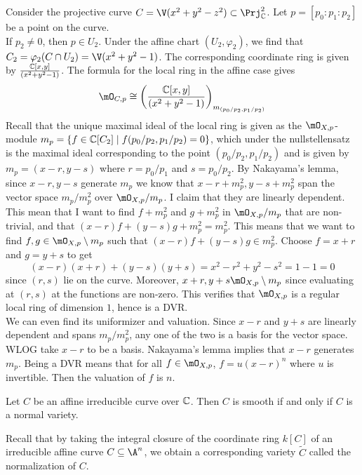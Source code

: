\documentclass[a4paper]{article}
\begin{document}
\begin{eg}{}{} Consider the projective curve $C=\V(x^2+y^2-z^2)\subset\Prj_\C^2$. Let $p=[p_0:p_1:p_2]$ be a point on the curve. \\

If $p_2\neq 0$, then $p\in U_2$. Under the affine chart $(U_2,\varphi_2)$, we find that $C_2=\varphi_2(C\cap U_2)=\V(x^2+y^2-1)$. The corresponding coordinate ring is given by $\frac{\mathbb{C}[x,y]}{(x^2+y^2-1)}$. The formula for the local ring in the affine case gives $$\mO_{C,p}\cong\left(\frac{\C[x,y]}{(x^2+y^2-1)}\right)_{m_{(p_0/p_2,p_1/p_2)}}$$ Recall that the unique maximal ideal of the local ring is given as the $\mO_{X,p}$-module $m_p=\{f\in\mathbb{C}[C_2]\;|\;f(p_0/p_2,p_1/p_2)=0\}$, which under the nullstellensatz is the maximal ideal corresponding to the point $(p_0/p_2,p_1/p_2)$ and is given by $m_p=(x-r,y-s)$ where $r=p_0/p_1$ and $s=p_0/p_2$. By Nakayama's lemma, since $x-r,y-s$ generate $m_p$ we know that $x-r+m_p^2,y-s+m_p^2$ span the vector space $m_p/m_p^2$ over $\mO_{X,p}/m_p$. I claim that they are linearly dependent. This mean that I want to find $f+m_p^2$ and $g+m_p^2$ in $\mO_{X,p}/m_p$ that are non-trivial, and that $(x-r)f+(y-s)g+m_p^2=m_p^2$. This means that we want to find $f,g\in\mO_{X,p}\setminus m_p$ such that $(x-r)f+(y-s)g\in m_p^2$. Choose $f=x+r$ and $g=y+s$ to get $$(x-r)(x+r)+(y-s)(y+s)=x^2-r^2+y^2-s^2=1-1=0$$ since $(r,s)$ lie on the curve. Moreover, $x+r,y+s\mO_{X,p}\setminus m_p$ since evaluating at $(r,s)$ at the functions are non-zero. This verifies that $\mO_{X,p}$ is a regular local ring of dimension $1$, hence is a DVR. \\

We can even find its uniformizer and valuation. Since $x-r$ and $y+s$ are linearly dependent and spans $m_p/m_p^2$, any one of the two is a basis for the vector space. WLOG take $x-r$ to be a basis. Nakayama's lemma implies that $x-r$ generates $m_p$. Being a DVR means that for all $f\in\mO_{X,p}$, $f=u(x-r)^n$ where $u$ is invertible. Then the valuation of $f$ is $n$. 
\end{eg}

\begin{prp}{}{} Let $C$ be an affine irreducible curve over $\mathbb{C}$. Then $C$ is smooth if and only if $C$ is a normal variety. 
\end{prp}

Recall that by taking the integral closure of the coordinate ring $k[C]$ of an irreducible affine curve $C\subseteq\A^n$, we obtain a corresponding variety $\widetilde{C}$ called the normalization of $C$. \\
\end{document}
